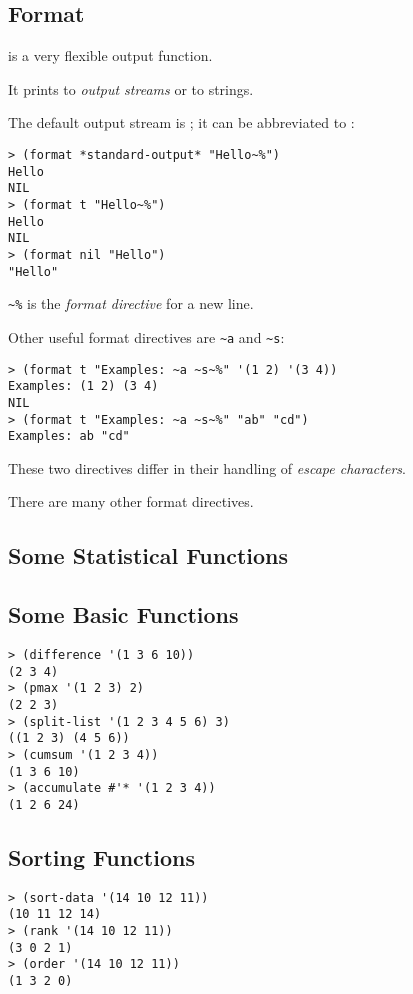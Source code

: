 \begin{slide}{}
\section{Format}
 is a very flexible output function.

It prints to {\em output streams} or to strings.

The default output stream is ; it can be
abbreviated to :
{\Large
\begin{verbatim}
> (format *standard-output* "Hello~%")
Hello
NIL
> (format t "Hello~%")
Hello
NIL
> (format nil "Hello")
"Hello"
\end{verbatim}}
\verb+~%+ is the {\em format directive} for a new line.
\end{slide}

\begin{slide}{}
Other useful format directives are \verb+~a+ and \verb+~s+:
{\Large
\begin{verbatim}
> (format t "Examples: ~a ~s~%" '(1 2) '(3 4))
Examples: (1 2) (3 4)
NIL
> (format t "Examples: ~a ~s~%" "ab" "cd")
Examples: ab "cd"
\end{verbatim}}
These two directives differ in their handling of {\em escape characters}.

There are many other format directives.
\end{slide}

\begin{slide}{}
\section{Some Statistical Functions}
\subsection{Some Basic Functions}
\begin{verbatim}
> (difference '(1 3 6 10))
(2 3 4)
> (pmax '(1 2 3) 2)
(2 2 3)
> (split-list '(1 2 3 4 5 6) 3)
((1 2 3) (4 5 6))
> (cumsum '(1 2 3 4))
(1 3 6 10)
> (accumulate #'* '(1 2 3 4))
(1 2 6 24)
\end{verbatim}

\subsection{Sorting Functions}
\begin{verbatim}
> (sort-data '(14 10 12 11))
(10 11 12 14)
> (rank '(14 10 12 11))
(3 0 2 1)
> (order '(14 10 12 11))
(1 3 2 0)
\end{verbatim}
\end{slide}


